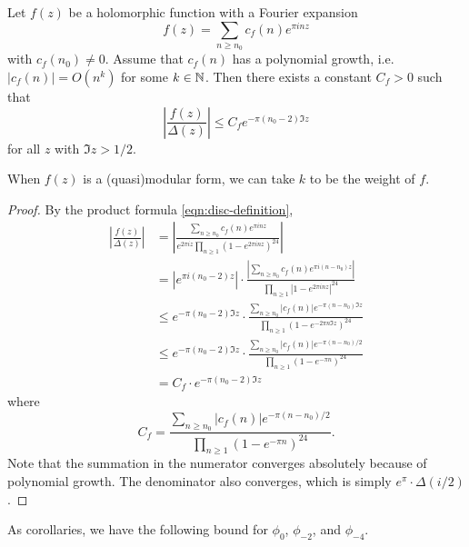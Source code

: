 \begin{lemma}\label{lemma:mod-div-disc-bound}\leanok
Let $f(z)$ be a holomorphic function with a Fourier expansion
\begin{equation}
    f(z) = \sum_{n \ge n_0} c_f(n) e^{\pi i n z}
\end{equation}
with $c_f(n_0) \ne 0$.
Assume that $c_f(n)$ has a polynomial growth, i.e. $|c_f(n)| = O(n^k)$ for some $k \in \mathbb{N}$.
Then there exists a constant $C_f > 0$ such that
\begin{equation}
    \left|\frac{f(z)}{\Delta(z)}\right| \le C_f e^{-\pi (n_0 - 2) \Im z}
\end{equation}
for all $z$ with $\Im z > 1/2$.
\end{lemma}
When $f(z)$ is a (quasi)modular form, we can take $k$ to be the weight of $f$.


\begin{proof}\leanok
By the product formula \eqref{eqn:disc-definition},
\begin{align}
    \left|\frac{f(z)}{\Delta(z)}\right| &= \left|\frac{\sum_{n \ge n_0} c_f(n) e^{\pi i n z}}{e^{2 \pi i z}\prod_{n \ge 1} (1 - e^{2\pi i n z})^{24}}\right| \\
    &= |e^{\pi i (n_0 - 2)z}| \cdot \frac{|\sum_{n \ge n_0} c_f(n) e^{\pi i (n - n_0) z}|}{\prod_{n \ge 1} |1 - e^{2\pi i n z}|^{24}} \\
    &\le e^{-\pi (n_0 - 2) \Im z} \cdot \frac{\sum_{n \ge n_0} |c_f(n)| e^{-\pi (n - n_0) \Im z}}{\prod_{n \ge 1} (1 - e^{- 2\pi n \Im z})^{24}} \\
    &\le e^{-\pi (n_0 - 2) \Im z} \cdot \frac{\sum_{n \ge n_0} |c_f(n)| e^{-\pi (n - n_0) / 2}}{\prod_{n \ge 1} (1 - e^{-\pi n})^{24}} \\
    &= C_f \cdot e^{-\pi (n_0 - 2) \Im z}
\end{align}
where
\begin{equation}
    C_f = \frac{\sum_{n \ge n_0} |c_f(n)| e^{-\pi (n - n_0) / 2}}{\prod_{n \ge 1} (1 - e^{-\pi n})^{24}}.
\end{equation}
Note that the summation in the numerator converges absolutely because of polynomial growth.
The denominator also converges, which is simply $e^{\pi} \cdot \Delta(i/2)$.
\end{proof}

As corollaries, we have the following bound for $\phi_0$, $\phi_{-2}$, and $\phi_{-4}$.

